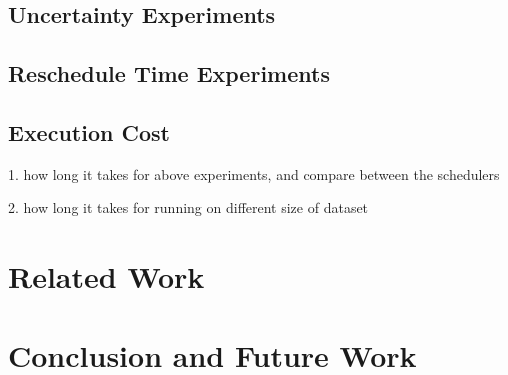 \documentclass[letterpaper, 10 pt, conference]{ieeeconf}
\begin{document}
\subsection{Uncertainty Experiments}

\subsection{Reschedule Time Experiments}

\subsection{Execution Cost}

1. how long it takes for above experiments, and compare between the schedulers

2. how long it takes for running on different size of dataset

\section{Related Work}

\section{Conclusion and Future Work}



\end{document}
